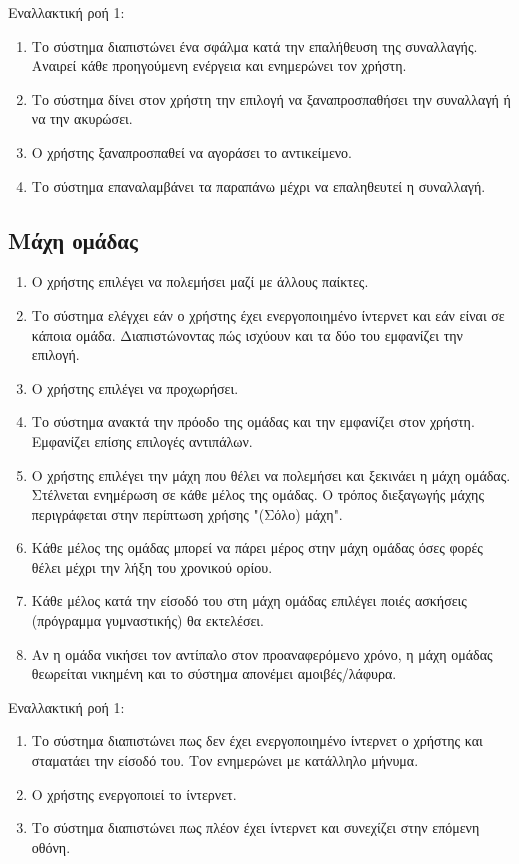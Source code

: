 Εναλλακτική ροή 1:
\begin{enumerate}[label=6.\alph*.,ref=6.\alph*]
    \item Το σύστημα διαπιστώνει ένα σφάλμα κατά την επαλήθευση της συναλλαγής. Αναιρεί κάθε προηγούμενη ενέργεια και ενημερώνει τον χρήστη. 
    \item Το σύστημα δίνει στον χρήστη την επιλογή να ξαναπροσπαθήσει την συναλλαγή ή να την ακυρώσει.
    \item Ο χρήστης ξαναπροσπαθεί να αγοράσει το αντικείμενο.
    \item Το σύστημα επαναλαμβάνει τα παραπάνω μέχρι να επαληθευτεί η συναλλαγή.
\end{enumerate}

\newpage
\subsection{Μάχη ομάδας}
\label{sec:clanbattle}
\begin{enumerate}
\item Ο χρήστης επιλέγει να πολεμήσει μαζί με άλλους παίκτες.
\item Το σύστημα ελέγχει εάν ο χρήστης έχει ενεργοποιημένο ίντερνετ και εάν είναι σε κάποια ομάδα. Διαπιστώνοντας πώς ισχύουν και τα δύο του εμφανίζει την επιλογή.
\item Ο χρήστης επιλέγει να προχωρήσει.
\item Το σύστημα ανακτά την πρόοδο της ομάδας και την εμφανίζει στον χρήστη. Εμφανίζει επίσης επιλογές αντιπάλων.
\item Ο χρήστης επιλέγει την μάχη που θέλει να πολεμήσει και ξεκινάει η μάχη ομάδας. Στέλνεται ενημέρωση σε κάθε μέλος της ομάδας. Ο τρόπος διεξαγωγής μάχης περιγράφεται στην περίπτωση χρήσης "(Σόλο) μάχη".
\item Κάθε μέλος της ομάδας μπορεί να πάρει μέρος στην μάχη ομάδας όσες φορές θέλει μέχρι την λήξη του χρονικού ορίου.
\item Κάθε μέλος κατά την είσοδό του στη μάχη ομάδας επιλέγει ποιές ασκήσεις (πρόγραμμα γυμναστικής) θα εκτελέσει.
\item Αν η ομάδα νικήσει τον αντίπαλο στον προαναφερόμενο χρόνο, η μάχη ομάδας θεωρείται νικημένη και το σύστημα απονέμει αμοιβές/λάφυρα.
\end{enumerate}

Εναλλακτική ροή 1:
\begin{enumerate}[label=2.\alph*.,ref=2.\alph*]
\item Το σύστημα διαπιστώνει πως δεν έχει ενεργοποιημένο ίντερνετ ο χρήστης και σταματάει την είσοδό του. Τον ενημερώνει με κατάλληλο μήνυμα.
\item Ο χρήστης ενεργοποιεί το ίντερνετ.
\item Το σύστημα διαπιστώνει πως πλέον έχει ίντερνετ και συνεχίζει στην επόμενη οθόνη.
\end{enumerate}

